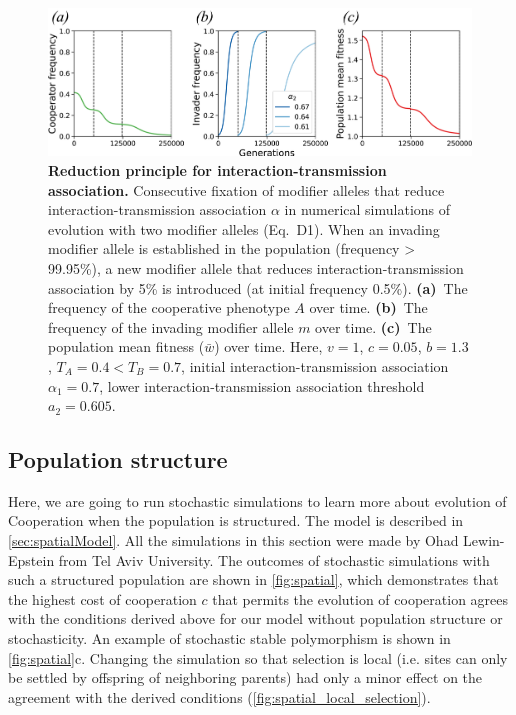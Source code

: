 \documentclass[12pt]{extarticle}
\begin{document}
\begin{figure}[h]
  \centering
  \includegraphics[width=1\textwidth]{../PRSB_figures/fig_6.pdf}
  \caption{
  \textbf{Reduction principle for interaction-transmission association.} 
  Consecutive fixation of modifier alleles that reduce interaction-transmission association $\alpha$ in numerical simulations of evolution with two modifier alleles (Eq.~D1).
  When an invading modifier allele is established in the population (frequency > 99.95\%), a new modifier allele that reduces interaction-transmission association by 5\% is introduced (at initial frequency 0.5\%).
  \textbf{(a)}~The frequency of the cooperative phenotype $A$ over time.
  \textbf{(b)}~The frequency of the invading modifier allele $m$ over time. 
  \textbf{(c)}~The population mean fitness ($\bar{w}$) over time.
  Here, $v=1$, $c = 0.05$, $b=1.3$, $T_A=0.4<T_B=0.7$, initial interaction-transmission association $\alpha_1=0.7$, lower interaction-transmission association threshold $a_2=0.605$.  
  }
  \label{fig:invasion}
\end{figure}
\newpage
\subsection{Population structure}
Here, we are going to run stochastic simulations to learn more about evolution of Cooperation when the population is structured. 
The model is described in \autoref{sec:spatialModel}.
All the simulations in this section were made by Ohad Lewin-Epstein from Tel Aviv University.
The outcomes of stochastic simulations with such a structured population are shown in \autoref{fig:spatial}, which demonstrates that the highest cost of cooperation $c$ that permits the evolution of cooperation agrees with the conditions derived above for our model without population structure or stochasticity.
An example of stochastic stable polymorphism is shown in \autoref{fig:spatial}c.
Changing the simulation so that selection is local (i.e. sites can only be settled by offspring of neighboring parents) had only a minor effect on the agreement with the derived conditions (\autoref{fig:spatial_local_selection}).
\end{document}

